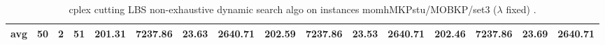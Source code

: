 \begin{sidewaystable}[!ht]
{\begin{tabular}{lccccccccccccccc}
\cline{1-16} \textbf{avg} & \textbf{50} & \textbf{2} & \textbf{51} & \textbf{201.31} & \textbf{7237.86} & \textbf{23.63} & \textbf{2640.71} & \textbf{202.59} & \textbf{7237.86} & \textbf{23.53} & \textbf{2640.71} & \textbf{202.46} & \textbf{7237.86} & \textbf{23.69} & \textbf{2640.71} \\ \cline{1-16}
\bottomrule
\end{tabular}
}%
\caption{cplex cutting LBS non-exhaustive dynamic search algo on instances momhMKPstu/MOBKP/set3 ($\lambda$ fixed) .}
\label{tab:table_lambda_dynamic_momhMKPstu/MOBKP/set3 }
\end{sidewaystable}
